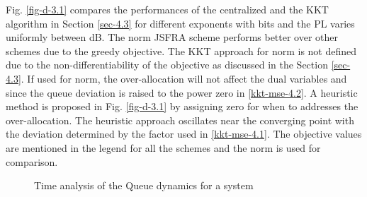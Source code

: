 Fig. \ref{fig-d-3.1} compares the performances of the centralized and the \ac{KKT} algorithm in Section \ref{sec-4.3} for different exponents with  bits and the \ac{PL} varies uniformly between \me{[0,-3]} dB. The  norm \ac{JSFRA} scheme performs better over other schemes due to the greedy objective. The \ac{KKT} approach for  norm is not defined due to the non-differentiability of the objective as discussed in the Section \ref{sec-4.3}. If used for  norm, the over-allocation will not affect the dual variables  and  since the queue deviation is raised to the power zero in \eqref{kkt-mse-4.2}. A heuristic method is proposed in Fig. \ref{fig-d-3.1} by assigning zero for  when  to addresses the over-allocation. The heuristic approach oscillates near the converging point with the deviation determined by the factor \me{\rho} used in \eqref{kkt-mse-4.1}. The objective values are mentioned in the legend for all the schemes and the  norm is used for comparison.
\begin{figure*}
	\centering
	\hfill
	\caption{Time analysis of the Queue dynamics for a system }
	\label{fig-time-analysis}
\end{figure*}

